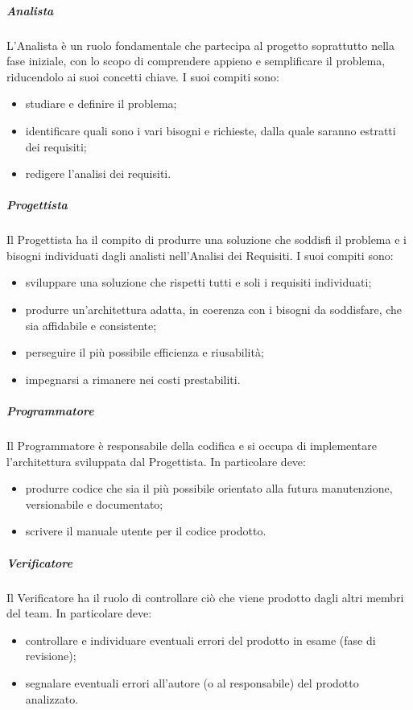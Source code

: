 \subparagraph{Analista}
L'Analista è un ruolo fondamentale che partecipa al progetto soprattutto nella fase iniziale, con lo scopo di comprendere appieno e semplificare il problema, riducendolo ai suoi concetti chiave.
I suoi compiti sono:
\begin{itemize}
\item studiare e definire il problema;
\item identificare quali sono i vari bisogni e richieste, dalla quale saranno estratti dei requisiti;
\item redigere l'analisi dei requisiti.
\end{itemize}

\subparagraph{Progettista}
Il Progettista ha il compito di produrre una soluzione che soddisfi il problema e i bisogni individuati dagli analisti nell'Analisi dei Requisiti.
I suoi compiti sono:
\begin{itemize}
\item sviluppare una soluzione che rispetti tutti e soli i requisiti individuati;
\item produrre un'architettura adatta, in coerenza con i bisogni da soddisfare, che sia affidabile e consistente;
\item perseguire il più possibile efficienza e riusabilità;
\item impegnarsi a rimanere nei costi prestabiliti.
\end{itemize}


\subparagraph{Programmatore}
Il Programmatore è responsabile della codifica e si occupa di implementare l'architettura sviluppata dal Progettista.
In particolare deve:
\begin{itemize}
\item produrre codice che sia il più possibile orientato alla futura manutenzione, versionabile e documentato;
\item scrivere il manuale utente per il codice prodotto.
\end{itemize}

\subparagraph{Verificatore}
Il Verificatore ha il ruolo di controllare ciò che viene prodotto dagli altri membri del team.
In particolare deve:
\begin{itemize}
\item controllare e individuare eventuali errori del prodotto in esame (fase di revisione);
\item segnalare eventuali errori all'autore (o al responsabile) del prodotto analizzato.
\end{itemize}


